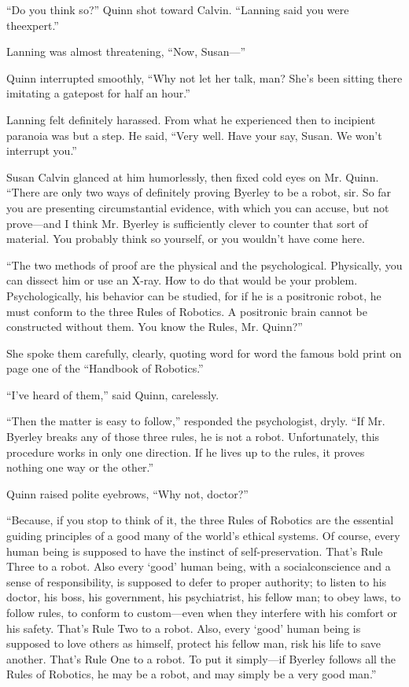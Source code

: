 \documentclass[10pt,a5paper,twoside]{book}
\begin{document}
“Do you think so?” Quinn shot toward Calvin. “Lanning said you were theexpert.”

Lanning was almost threatening, “Now, Susan—”

Quinn interrupted smoothly, “Why not let her talk, man? She’s been sitting there imitating a gatepost for half an hour.”

Lanning felt definitely harassed. From what he experienced then to incipient paranoia was but a step. He said, “Very well. Have your say, Susan. We won’t interrupt you.”

Susan Calvin glanced at him humorlessly, then fixed cold eyes on Mr. Quinn. “There are only two ways of definitely proving Byerley to be a robot, sir. So far you are presenting circumstantial evidence, with which you can accuse, but not prove—and I think Mr. Byerley is sufficiently clever to counter that sort of material. You probably think so yourself, or you wouldn’t have come here.

“The two methods of proof are the physical and the psychological. Physically, you can dissect him or use an X-ray. How to do that would be your problem. Psychologically, his behavior can be studied, for if he is a positronic robot, he must conform to the three Rules of Robotics. A positronic brain cannot be constructed without them. You know the Rules, Mr. Quinn?”

She spoke them carefully, clearly, quoting word for word the famous bold print on page one of the “Handbook of Robotics.”

“I’ve heard of them,” said Quinn, carelessly.

“Then the matter is easy to follow,” responded the psychologist, dryly. “If Mr. Byerley breaks any of those three rules, he is not a robot. Unfortunately, this procedure works in only one direction. If he lives up to the rules, it proves nothing one way or the other.”

Quinn raised polite eyebrows, “Why not, doctor?”

“Because, if you stop to think of it, the three Rules of Robotics are the essential guiding principles of a good many of the world’s ethical systems. Of course, every human being is supposed to have the instinct of self-preservation. That’s Rule Three to a robot. Also every ‘good’ human being, with a socialconscience and a sense of responsibility, is supposed to defer to proper authority; to listen to his doctor, his boss, his government, his psychiatrist, his fellow man; to obey laws, to follow rules, to conform to custom—even when they interfere with his comfort or his safety. That’s Rule Two to a robot. Also, every ‘good’ human being is supposed to love others as himself, protect his fellow man, risk his life to save another. That’s Rule One to a robot. To put it simply—if Byerley follows all the Rules of Robotics, he may be a robot, and may simply be a very good man.”
\end{document}
